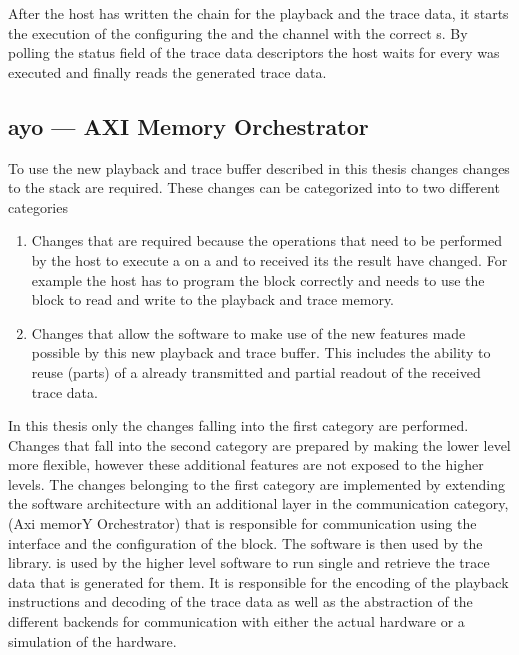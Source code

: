 After the host has written the \descriptor{} chain for the playback and the trace data, it starts the execution of the \PlaybackProgram{} configuring the \SToMM{} and the \MMToS{} channel with the correct \descriptor{}s.
By polling the status field of the trace data descriptors the host waits for every \PlaybackProgram{} was executed and finally reads the generated trace data.
\subsection{ayo --- AXI Memory Orchestrator}
To use the new playback and trace buffer described in this thesis changes changes to the \BSSTwo{} stack are required. These changes can be categorized into to two different categories
\begin{enumerate}
\item Changes that are required because the operations that need to be performed by the host to execute a \PlaybackProgram{} on a \FPGA{} and to received its the result have changed. For example the host has to program the \AXIDMA{} block correctly and needs to use the \FAXI{} block to read and write to the playback and trace memory.
\item Changes that allow the software to make use of the new features made possible by this new playback and trace buffer. This includes the ability to reuse (parts) of a already transmitted \PlaybackProgram{} and partial readout of the received trace data.
\end{enumerate}

In this thesis only the changes falling into the first category are performed. Changes that fall into the second category are prepared by making the lower level \API{} more flexible, however these additional features are not exposed to the higher levels. The changes belonging to the first category are implemented by extending the \BSSTwo{} software architecture with an additional layer in the communication category, \ayo{} (Axi memorY Orchestrator) that is responsible for communication using the \FAXI{} interface and the configuration of the \AXIDMA{} block. The \ayo{} software is then used by the \hxcomm{} library. \hxcomm{} is used by the higher level software to run single \PlaybackProgram{} and retrieve the trace data that is generated for them. It is responsible for the \UT{} encoding of the playback instructions and \UT{} decoding of the trace data as well as the abstraction of the different backends for communication with either the actual hardware or a simulation of the hardware.

